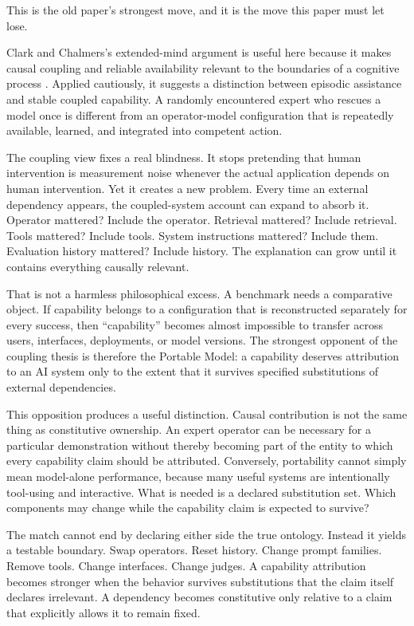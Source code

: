 \documentclass[11pt]{article}
\begin{document}
This is the old paper's strongest move, and it is the move this paper must let lose.

Clark and Chalmers's extended-mind argument is useful here because it makes causal coupling and reliable availability relevant to the boundaries of a cognitive process \cite{clark1998extended}. Applied cautiously, it suggests a distinction between episodic assistance and stable coupled capability. A randomly encountered expert who rescues a model once is different from an operator-model configuration that is repeatedly available, learned, and integrated into competent action.

The coupling view fixes a real blindness. It stops pretending that human intervention is measurement noise whenever the actual application depends on human intervention. Yet it creates a new problem. Every time an external dependency appears, the coupled-system account can expand to absorb it. Operator mattered? Include the operator. Retrieval mattered? Include retrieval. Tools mattered? Include tools. System instructions mattered? Include them. Evaluation history mattered? Include history. The explanation can grow until it contains everything causally relevant.

That is not a harmless philosophical excess. A benchmark needs a comparative object. If capability belongs to a configuration that is reconstructed separately for every success, then ``capability'' becomes almost impossible to transfer across users, interfaces, deployments, or model versions. The strongest opponent of the coupling thesis is therefore the Portable Model: a capability deserves attribution to an AI system only to the extent that it survives specified substitutions of external dependencies.

This opposition produces a useful distinction. Causal contribution is not the same thing as constitutive ownership. An expert operator can be necessary for a particular demonstration without thereby becoming part of the entity to which every capability claim should be attributed. Conversely, portability cannot simply mean model-alone performance, because many useful systems are intentionally tool-using and interactive. What is needed is a declared substitution set. Which components may change while the capability claim is expected to survive?

The match cannot end by declaring either side the true ontology. Instead it yields a testable boundary. Swap operators. Reset history. Change prompt families. Remove tools. Change interfaces. Change judges. A capability attribution becomes stronger when the behavior survives substitutions that the claim itself declares irrelevant. A dependency becomes constitutive only relative to a claim that explicitly allows it to remain fixed.
\end{document}
